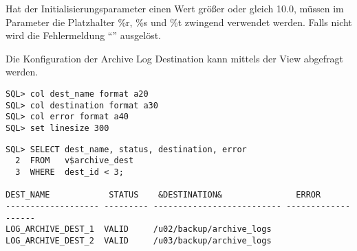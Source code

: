           \begin{merke}
            Hat der Initialisierungsparameter  einen Wert größer oder gleich 10.0, müssen im Parameter  die Platzhalter \%r, \%s und \%t zwingend verwendet werden. Falls nicht wird die Fehlermeldung \enquote{} ausgelöst.
          \end{merke}
          Die Konfiguration der Archive Log Destination kann mittels der View  abgefragt werden.
          \begin{lstlisting}[caption={Die Konfiguration der Archive Log Destination abfragen},label=admin50,language=sqlplus]
SQL> col dest_name format a20
SQL> col destination format a30
SQL> col error format a40
SQL> set linesize 300
					\end{lstlisting}
\clearpage
\begin{lstlisting}[caption={Die Konfiguration der Archive Log Destination abfragen - Fortsetzung},label=admin50a,language=oracle_sql]
SQL> SELECT dest_name, status, destination, error
  2  FROM   v$archive_dest
  3  WHERE  dest_id < 3;

DEST_NAME            STATUS    &DESTINATION&               ERROR
------------------- --------- -------------------------- -------------------
LOG_ARCHIVE_DEST_1  VALID     /u02/backup/archive_logs
LOG_ARCHIVE_DEST_2  VALID     /u03/backup/archive_logs
          \end{lstlisting}
